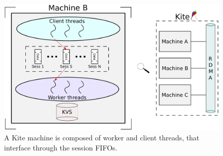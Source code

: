 \begin{figure}[t]
  \centering
  \includegraphics[scale=0.25]{1_figures/Wrkr-clt-Interface.pdf}
  \caption{A Kite machine is composed of worker and client threads, that interface through the session FIFOs.}
  \label{fig:interface}
\end{figure}